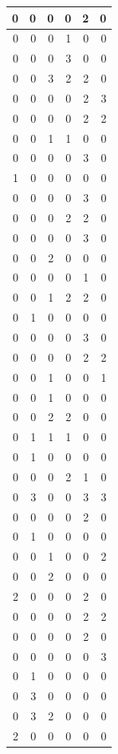 \documentclass[
  12pt,
]{krantz}
\begin{document}
\begin{tabular}{r|r|r|r|r|r}
\hline
0 & 0 & 0 & 0 & 2 & 0\\
\hline
0 & 0 & 0 & 1 & 0 & 0\\
\hline
0 & 0 & 0 & 3 & 0 & 0\\
\hline
0 & 0 & 3 & 2 & 2 & 0\\
\hline
0 & 0 & 0 & 0 & 2 & 3\\
\hline
0 & 0 & 0 & 0 & 2 & 2\\
\hline
0 & 0 & 1 & 1 & 0 & 0\\
\hline
0 & 0 & 0 & 0 & 3 & 0\\
\hline
1 & 0 & 0 & 0 & 0 & 0\\
\hline
0 & 0 & 0 & 0 & 3 & 0\\
\hline
0 & 0 & 0 & 2 & 2 & 0\\
\hline
0 & 0 & 0 & 0 & 3 & 0\\
\hline
0 & 0 & 2 & 0 & 0 & 0\\
\hline
0 & 0 & 0 & 0 & 1 & 0\\
\hline
0 & 0 & 1 & 2 & 2 & 0\\
\hline
0 & 1 & 0 & 0 & 0 & 0\\
\hline
0 & 0 & 0 & 0 & 3 & 0\\
\hline
0 & 0 & 0 & 0 & 2 & 2\\
\hline
0 & 0 & 1 & 0 & 0 & 1\\
\hline
0 & 0 & 1 & 0 & 0 & 0\\
\hline
0 & 0 & 2 & 2 & 0 & 0\\
\hline
0 & 1 & 1 & 1 & 0 & 0\\
\hline
0 & 1 & 0 & 0 & 0 & 0\\
\hline
0 & 0 & 0 & 2 & 1 & 0\\
\hline
0 & 3 & 0 & 0 & 3 & 3\\
\hline
0 & 0 & 0 & 0 & 2 & 0\\
\hline
0 & 1 & 0 & 0 & 0 & 0\\
\hline
0 & 0 & 1 & 0 & 0 & 2\\
\hline
0 & 0 & 2 & 0 & 0 & 0\\
\hline
2 & 0 & 0 & 0 & 2 & 0\\
\hline
0 & 0 & 0 & 0 & 2 & 2\\
\hline
0 & 0 & 0 & 0 & 2 & 0\\
\hline
0 & 0 & 0 & 0 & 0 & 3\\
\hline
0 & 1 & 0 & 0 & 0 & 0\\
\hline
0 & 3 & 0 & 0 & 0 & 0\\
\hline
0 & 3 & 2 & 0 & 0 & 0\\
\hline
2 & 0 & 0 & 0 & 0 & 0\\

\end{tabular}
\end{document}
